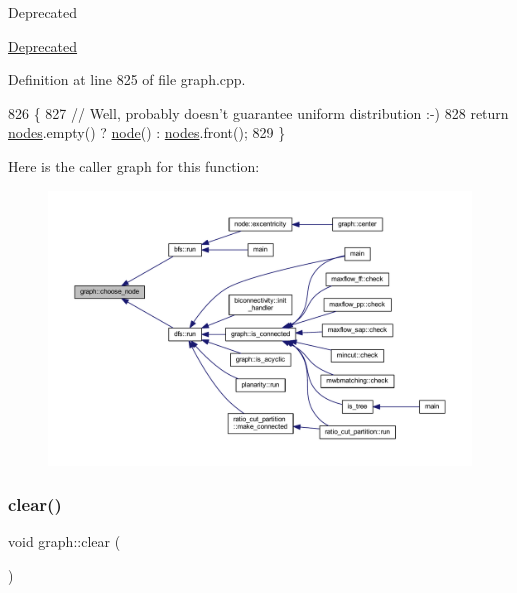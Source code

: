 \begin{DoxyRefDesc}{Deprecated}
\item[\mbox{\hyperlink{deprecated__deprecated000005}{Deprecated}}]\end{DoxyRefDesc}


Definition at line 825 of file graph.\+cpp.


\begin{DoxyCode}
826 \{
827     \textcolor{comment}{// Well, probably doesn't guarantee uniform distribution :-)}
828     \textcolor{keywordflow}{return} \mbox{\hyperlink{classgraph_a4ea0592e8eb7c26c5abad24546907726}{nodes}}.empty() ? \mbox{\hyperlink{classnode}{node}}() : \mbox{\hyperlink{classgraph_a4ea0592e8eb7c26c5abad24546907726}{nodes}}.front();
829 \}
\end{DoxyCode}
Here is the caller graph for this function\+:
\nopagebreak
\begin{figure}[H]
\begin{center}
\leavevmode
\includegraphics[width=350pt]{classgraph_aec5c11c90a94ebd145f059a541db860e_icgraph}
\end{center}
\end{figure}
\mbox{\label{classgraph_a9ff5d6af3653e79f87b836701453f55a}} 
\subsubsection{\texorpdfstring{clear()}{clear()}}
{\footnotesize\ttfamily void graph\+::clear (\begin{DoxyParamCaption}{ }\end{DoxyParamCaption})\hspace{0.3cm}{\ttfamily [inherited]}}

